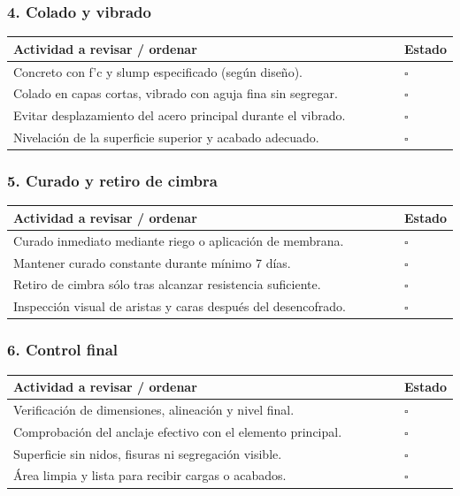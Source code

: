 \documentclass[12pt]{article}
\newcommand{\cbox}{\(\square\)}
\renewcommand{\cbox}{\(\square\)} %
\begin{document}
	\subsubsection*{4. Colado y vibrado}
	\begin{tabularx}{\linewidth}{>{\raggedright\arraybackslash}p{0.93\linewidth} >{\centering\arraybackslash}m{0.07\linewidth}}
		\toprule
		\textbf{Actividad a revisar / ordenar} & \textbf{Estado}\\
		\midrule
		Concreto con f’c y slump especificado (según diseño). & \cbox \\
		Colado en capas cortas, vibrado con aguja fina sin segregar. & \cbox \\
		Evitar desplazamiento del acero principal durante el vibrado. & \cbox \\
		Nivelación de la superficie superior y acabado adecuado. & \cbox \\
		\bottomrule
	\end{tabularx}
	
	\subsubsection*{5. Curado y retiro de cimbra}
	\begin{tabularx}{\linewidth}{>{\raggedright\arraybackslash}p{0.93\linewidth} >{\centering\arraybackslash}m{0.07\linewidth}}
		\toprule
		\textbf{Actividad a revisar / ordenar} & \textbf{Estado}\\
		\midrule
		Curado inmediato mediante riego o aplicación de membrana. & \cbox \\
		Mantener curado constante durante mínimo 7 días. & \cbox \\
		Retiro de cimbra sólo tras alcanzar resistencia suficiente. & \cbox \\
		Inspección visual de aristas y caras después del desencofrado. & \cbox \\
		\bottomrule
	\end{tabularx}
	
	\subsubsection*{6. Control final}
	\begin{tabularx}{\linewidth}{>{\raggedright\arraybackslash}p{0.93\linewidth} >{\centering\arraybackslash}m{0.07\linewidth}}
		\toprule
		\textbf{Actividad a revisar / ordenar} & \textbf{Estado}\\
		\midrule
		Verificación de dimensiones, alineación y nivel final. & \cbox \\
		Comprobación del anclaje efectivo con el elemento principal. & \cbox \\
		Superficie sin nidos, fisuras ni segregación visible. & \cbox \\
		Área limpia y lista para recibir cargas o acabados. & \cbox \\
		\bottomrule
	\end{tabularx}
	
\end{document}
